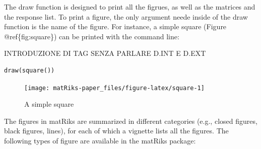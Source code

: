 The draw function is designed to print all the figrues, as well as the matrices and the response list.
To print a figure, the only argument neede inside of the draw function is the name of the figure.
For instance, a simple square (Figure @ref\{fig:square\}) can be printed with the command line:

INTRODUZIONE DI TAG SENZA PARLARE D.INT E D.EXT

\begin{verbatim}
draw(square())
\end{verbatim}

\begin{figure}

{\centering \texttt{[image: matRiks-paper\_files/figure-latex/square-1]} 

}

\caption{A simple square}\label{fig:square}
\end{figure}

The figures in matRiks are summarized in different categories (e.g., closed figures, black figures, lines), for each of which a vignette lists all the figures.
The following types of figure are available in the matRiks package:

